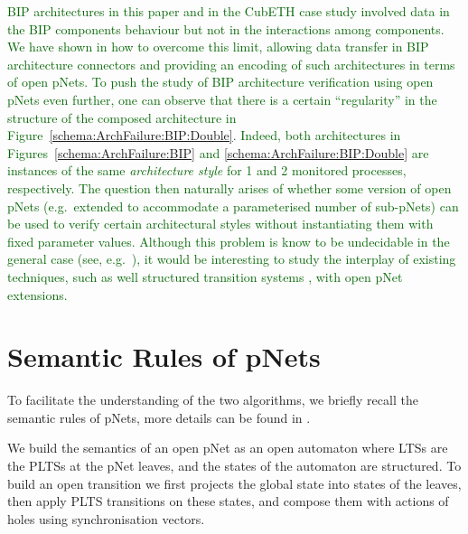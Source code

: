 \documentclass[smallcondensed]{svjour3}
\newcommand{\Simon}[1]{\textcolor{darkgreen}{#1}}
\newcommand{\eg}[1][\ ]{e.g.#1}
\begin{document}
\Simon{BIP architectures in this paper and in the CubETH case study \cite{CubETH-case-study} involved data in the BIP components behaviour but not in the interactions among components.  We have shown in \cite{BHM19:Coordination} how to overcome this limit, allowing data transfer in BIP architecture connectors and providing an encoding of such architectures in terms of open pNets.  To push the study of BIP architecture verification using open pNets even further, one can observe that there is a certain ``regularity'' in the structure of the composed architecture in Figure~\ref{schema:ArchFailure:BIP:Double}.  Indeed, both architectures in Figures~\ref{schema:ArchFailure:BIP} and \ref{schema:ArchFailure:BIP:Double} are instances of the same \emph{architecture style} \cite{MBBS16-diagrams} for 1 and 2 monitored processes, respectively.  The question then naturally arises of whether some version of open pNets (\eg extended to accommodate a parameterised number of sub-pNets) can be used to verify certain architectural styles without instantiating them with fixed parameter values.  Although this problem is know to be undecidable in the general case (see, \eg \cite{KKW+16-foil-concur}), it would be interesting to study the interplay of existing techniques, such as well structured transition systems \cite{WSTSE!}, with open pNet extensions.}







\appendix

\section{Semantic Rules of pNets }
\label{appendix:semRules}

To facilitate the understanding of the two algorithms, we briefly recall the semantic rules of pNets, more details can be found in \cite{henrio:Forte2016}.

We build the semantics of an open pNet as an open automaton where
LTSs are the PLTSs at 
the pNet leaves, and the states of the automaton are structured. 
To build an open transition we first
 projects the global state into states of the leaves, then apply
PLTS transitions on these states, and compose them with actions of
holes using synchronisation vectors. 
\end{document}
